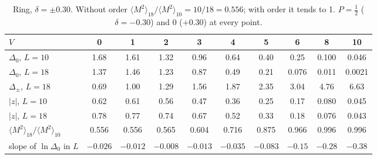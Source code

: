 \documentclass[11pt,a4paper]{article}
\begin{document}
\begin{table}[t]
  \centering
  \footnotesize
  \begin{tabular}{lccccccccc}
    \toprule
    $V$ & 0 & 1 & 2 & 3 & 4 & 5 & 6 & 8 & 10 \\
    \midrule
    $\Delta_0$, $L=10$ & 1.68 & 1.61 & 1.32 & 0.96 & 0.64 & 0.40 & 0.25 & 0.100 & 0.046 \\
    $\Delta_0$, $L=18$ & 1.37 & 1.46 & 1.23 & 0.87 & 0.49 & 0.21 & 0.076 & 0.011 & 0.0021 \\
    $\Delta_\pm$, $L=18$ & 0.69 & 1.00 & 1.29 & 1.56 & 1.87 & 2.35 & 3.04 & 4.76 & 6.63 \\
    $|z|$, $L=10$ & 0.62 & 0.61 & 0.56 & 0.47 & 0.36 & 0.25 & 0.17 & 0.080 & 0.045 \\
    $|z|$, $L=18$ & 0.78 & 0.77 & 0.74 & 0.67 & 0.52 & 0.33 & 0.18 & 0.076 & 0.043 \\
    $\langle M^2\rangle_{18}/\langle M^2\rangle_{10}$ & 0.556 & 0.556 & 0.565 & 0.604 & 0.716 & 0.875 & 0.966 & 0.996 & 0.996 \\
    slope of $\ln\Delta_0$ in $L$ & $-0.026$ & $-0.012$ & $-0.008$ & $-0.013$ & $-0.035$ & $-0.083$ & $-0.15$ & $-0.28$ & $-0.38$ \\
    \bottomrule
  \end{tabular}
  \caption{Ring, $\delta=\pm0.30$. Without order $\langle M^2\rangle_{18}/\langle M^2\rangle_{10}=10/18=0.556$; with order it tends to 1. $P=\tfrac12$ ($\delta=-0.30$) and $0$ ($+0.30$) at every point.}
  \label{tab:step6}
\end{table}
\end{document}
